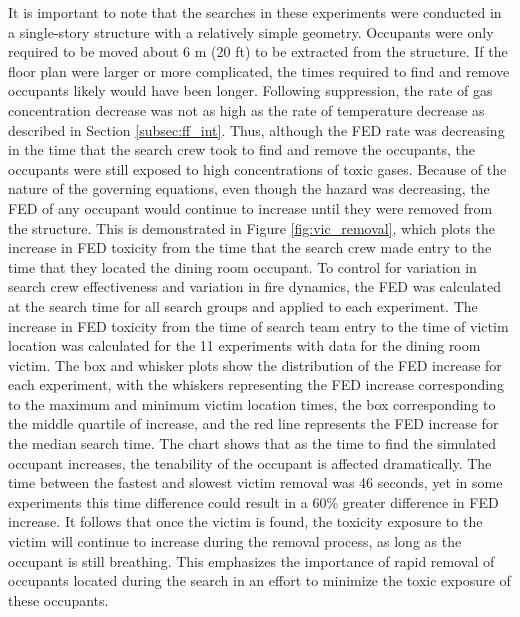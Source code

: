 It is important to note that the searches in these experiments were conducted in a single-story structure with a relatively simple geometry. Occupants were only required to be moved about 6 m (20 ft) to be extracted from the structure. If the floor plan were larger or more complicated, the times required to find and remove occupants likely would have been longer. Following suppression, the rate of gas concentration decrease was not as high as the rate of temperature decrease as described in Section \ref{subsec:ff_int}. Thus, although the FED rate was decreasing in the time that the search crew took to find and remove the occupants, the occupants were still exposed to high concentrations of toxic gases. Because of the nature of the governing equations, even though the hazard was decreasing, the FED of any occupant would continue to increase until they were removed from the structure. This is demonstrated in Figure \ref{fig:vic_removal}, which plots the increase in FED toxicity from the time that the search crew made entry to the time that they located the dining room occupant. To control for variation in search crew effectiveness and variation in fire dynamics, the FED was calculated at the search time for all search groups and applied to each experiment. The increase in FED toxicity from the time of search team entry to the time of victim location was calculated for the 11 experiments with data for the dining room victim. The box and whisker plots show the distribution of the FED increase for each experiment, with the whiskers representing the FED increase corresponding to the maximum and minimum victim location times, the box corresponding to the middle quartile of increase, and the red line represents the FED increase for the median search time.  The chart shows that as the time to find the simulated occupant increases, the tenability of the occupant is affected dramatically. The time between the fastest and slowest victim removal was 46 seconds, yet in some experiments this time difference could result in a 60\% greater difference in FED increase. It follows that once the victim is found, the toxicity exposure to the victim will continue to increase during the removal process, as long as the occupant is still breathing. This emphasizes the importance of rapid removal of occupants located during the search in an effort to minimize the toxic exposure of these occupants. 


